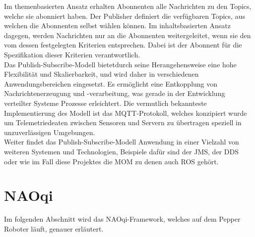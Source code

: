 Im themenbasierten Ansatz erhalten Abonnenten alle Nachrichten zu den Topics, welche sie abonniert haben. Der Publisher definiert die verfügbaren Topics, aus welchen die Abonnenten selbst wählen können. Im inhaltsbasierten Ansatz dagegen, werden Nachrichten nur an die Abonnenten weitergeleitet, wenn sie den vom dessen festgelegten Kriterien entsprechen. Dabei ist der Abonnent für die Spezifikation dieser Kriterien verantwortlich\cite{itwissen_publish_subscribe_model}.\\
Das Publish-Subscribe-Modell bietetdurch seine Herangehensweise eine hohe Flexibilität und Skalierbarkeit, und wird daher in verschiedenen Anwendungsbereichen eingesetzt. Es ermöglicht eine Entkopplung von Nachrichtenerzeugung und -verarbeitung, was gerade in der Entwicklung verteilter Systeme Prozesse erleichtert. Die vermutlich bekannteste Implementierung des Modell ist das MQTT-Protokoll, welches konzipiert wurde um Telemetriedeaten zwischen Sensoren und Servern zu übertragen speziell in unzuverlässigen Umgebungen\cite{elektronik_kompendium_publish_subscribe}.\\
Weiter findet das Publish-Subscribe-Modell Anwendung in einer Vielzahl von weiteren Systemen und Technologien, Beispiele dafür sind der \ac{JMS}, der \ac{DDS} oder wie im Fall diese Projektes die \ac{MOM} zu denen auch \ac{ROS} gehört.\\

\section{NAOqi}
\label{sec:NAOqi}
Im folgenden Abschnitt wird das NAOqi-Framework, welches auf dem Pepper Roboter läuft, genauer erläutert.\\

